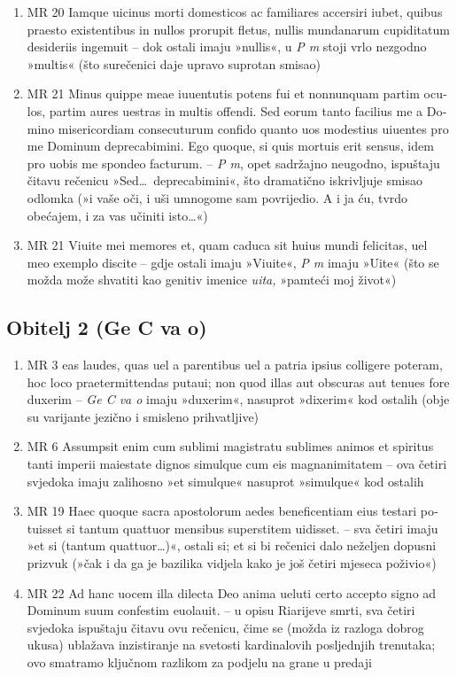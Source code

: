 \documentclass[a5paper,twoside]{article}
\begin{document}
\begin{enumerate}[label=\alph*)]
\item MR 20 \textlatin{Iamque uicinus morti domesticos ac familiares accersiri iubet, quibus praesto existentibus in nullos prorupit fletus, nullis mundanarum cupiditatum desideriis ingemuit} – dok ostali imaju »nullis«, u \textit{P m} stoji vrlo nezgodno »multis« (što surečenici daje upravo suprotan smisao)
\item MR 21 \textlatin{Minus quippe meae iuuentutis potens fui et nonnunquam partim oculos, partim aures uestras in multis offendi. Sed eorum tanto facilius me a Domino misericordiam consecuturum confido quanto uos modestius uiuentes pro me Dominum deprecabimini. Ego quoque, si quis mortuis erit sensus, idem pro uobis me spondeo facturum.} – \textit{P m}, opet sadržajno neugodno, ispuštaju čitavu rečenicu »Sed\dots\ deprecabimini«, što dramatično iskrivljuje smisao odlomka (»i vaše oči, i uši umnogome sam povrijedio. A i ja ću, tvrdo obećajem, i za vas učiniti isto\dots«)
\item MR 21 \textlatin{Viuite mei memores et, quam caduca sit huius mundi felicitas, uel meo exemplo discite} – gdje ostali imaju »Viuite«, \textit{P m} imaju »Uite« (što se možda može shvatiti kao genitiv imenice \textit{uita,} »pamteći moj život«)
\end{enumerate}
\subsection{Obitelj 2 (Ge C va o)}
\begin{enumerate}[label=\alph*)]
\item MR 3 \textlatin{eas laudes, quas uel a parentibus uel a patria ipsius colligere poteram, hoc loco praetermittendas putaui; non quod illas aut obscuras aut tenues fore duxerim} – \textit{Ge C va o} imaju »duxerim«, nasuprot »dixerim« kod ostalih (obje su varijante jezično i smisleno prihvatljive)
\item MR 6 \textlatin{Assumpsit enim cum sublimi magistratu sublimes animos et spiritus tanti imperii maiestate dignos simulque cum eis magnanimitatem} – ova četiri svjedoka imaju zalihosno »et simulque« nasuprot »simulque« kod ostalih
\item MR 19 \textlatin{Haec quoque sacra apostolorum aedes beneficentiam eius testari potuisset si tantum quattuor mensibus superstitem uidisset.} – sva četiri imaju »et si (tantum quattuor\dots)«, ostali si; et si bi rečenici dalo neželjen dopusni prizvuk (»čak i da ga je bazilika vidjela kako je još četiri mjeseca poživio«)
\item MR 22 \textlatin{Ad hanc uocem illa dilecta Deo anima ueluti certo accepto signo ad Dominum suum confestim euolauit.} – u opisu Riarijeve smrti, sva četiri svjedoka ispuštaju čitavu ovu rečenicu, čime se (možda iz razloga dobrog ukusa) ublažava inzistiranje na svetosti kardinalovih posljednjih trenutaka; ovo smatramo ključnom razlikom za podjelu na grane u predaji
\end{enumerate}
\end{document}
